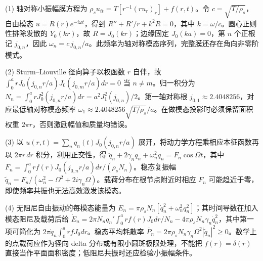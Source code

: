(1) 轴对称小振幅膜方程为 \(\rho_su_{tt}=T[r^{-1}(ru_r)_r]+f(r,t)\)。令 \(c=\sqrt{T/\rho_s}\)，自由模态 \(u=R(r)e^{-i\omega t}\)，得到 \(R''+R'/r+k^2R=0\)，其中 \(k=\omega/c\)。圆心正则性排除发散的 \(Y_0(kr)\)，故 \(R=J_0(kr)\)；边缘固定 \(J_0(ka)=0\)，第 \(n\) 个正根记 \(j_{0,n}\)，因此 \(\omega_n=c\,j_{0,n}/a\)。此频率为轴对称模态序列，完整膜还存在角向非零阶模式。

(2) Sturm--Liouville 径向算子以权函数 \(r\) 自伴，故 \(\int_0^arJ_0(j_{0,n}r/a)J_0(j_{0,m}r/a)dr=0\) 当 \(n\ne m\)。归一积分为 \(N_n=\int_0^arJ_0^2(j_{0,n}r/a)dr=a^2J_1^2(j_{0,n})/2\)。第一轴对称根 \(j_{0,1}\approx2.4048256\)，对应最低轴对称模态频率 \(\omega_1\approx2.4048256\sqrt{T/\rho_s}/a\)。在做模态投影时必须保留面积权重 \(2\pi r\)，否则激励幅值和质量均错误。

(3) 以 \(u(r,t)=\sum_nq_n(t)J_0(j_{0,n}r/a)\) 展开，将动力学方程乘相应本征函数再以 \(2\pi r\,dr\) 积分，利用正交性，得 \(\ddot q_n+2\gamma_n\dot q_n+\omega_n^2q_n=F_n\cos\Omega t\)，其中 \(F_n=\int_0^a r f(r)J_0(j_{0,n}r/a)dr/(\rho_sN_n)\)。稳态复振幅 \(\tilde q_n=F_n/(\omega_n^2-\Omega^2+2i\gamma_n\Omega)\)。载荷分布在根节点附近时相应 \(F_n\) 可能趋近于零，即使频率共振也无法高效激发该模态。

(4) 无阻尼自由振动的每模态能量为 \(E_n=\pi\rho_sN_n[\dot q_n^2+\omega_n^2q_n^2]\)；其时间导数在加入模态阻尼及载荷后给 \(\dot E_n=2\pi N_nq_n'\int_0^ar f(r)J_0 dr/N_n-4\pi\rho_sN_n\gamma_n\dot q_n^2\)，其中第一项可简化为 \(2\pi\dot q_n\int_0^ar fJ_0dr\)。稳态平均耗散率 \(\overline P_n=2\pi\rho_sN_n\gamma_n\Omega^2|\tilde q_n|^2\ge0\)。数学上的点载荷应作为径向 delta 分布或有限小圆斑极限处理，不能把 \(f(r)=\delta(r)\) 直接当作平面面积密度；低阻尼共振时还应检验小振幅条件。
